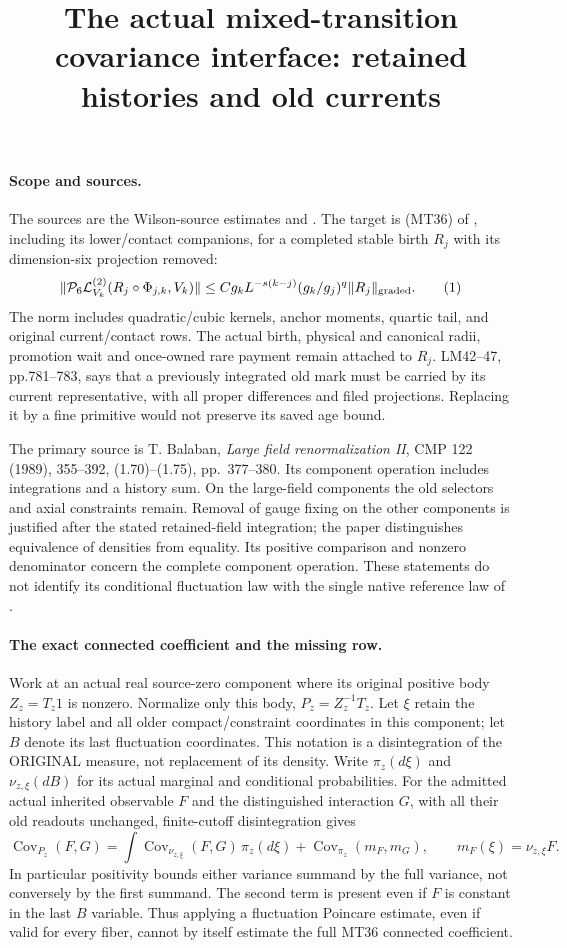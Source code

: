 \documentclass[11pt]{article}
\title{The actual mixed-transition covariance interface: retained histories and old currents}\author{}\date{}
\newcommand{\Cov}{\operatorname{Cov}}
\begin{document}
\maketitle
\paragraph{Scope and sources.}
The sources are the Wilson-source estimates \cite{W} and \cite{ND}.
The target is (MT36) of \cite[p.~692]{W}, including its lower/contact companions, for a
completed stable birth $R_j$ with its dimension-six projection removed:
\[
 \|\mathcal P_6\mathcal L^{(2)}_{V_k}(R_j\circ\Phi_{j,k},V_k)\|
 \le Cg_k L^{-s(k-j)}(g_k/g_j)^q\|R_j\|_{\rm graded}.
\tag{1}
\]
The norm includes quadratic/cubic kernels, anchor moments, quartic tail, and
original current/contact rows. The actual birth, physical and canonical radii,
promotion wait and once-owned rare payment remain attached to $R_j$.
LM42--47, pp.781--783, says that a previously integrated old mark must be carried
by its current representative, with all proper differences and filed projections.
Replacing it by a fine primitive would not preserve its saved age bound.

The primary source is T. Balaban, \emph{Large field renormalization II},
CMP 122 (1989), 355--392, (1.70)--(1.75), pp.~377--380.
Its component operation includes integrations and a history sum. On the large-field
components the old selectors and axial constraints remain. Removal of gauge fixing
on the other components is justified after the stated retained-field integration;
the paper distinguishes equivalence of densities from equality. Its positive
comparison and nonzero denominator concern the complete component operation.
These statements do not identify its conditional fluctuation law with the
single native reference law of \cite[Section 3]{ND}.

\paragraph{The exact connected coefficient and the missing row.}
Work at an actual real source-zero component where its original positive body
$Z_z=T_z1$ is nonzero. Normalize only this body, $P_z=Z_z^{-1}T_z$.
Let $\xi$ retain the history label and all older compact/constraint coordinates
in this component; let $B$ denote its last fluctuation coordinates. This notation
is a disintegration of the ORIGINAL measure, not replacement of its density.
Write $\pi_z(d\xi)$ and $\nu_{z,\xi}(dB)$ for its actual marginal and conditional
probabilities. For the admitted actual inherited observable $F$ and the distinguished
interaction $G$, with all their old readouts unchanged, finite-cutoff disintegration gives
\[
 \Cov_{P_z}(F,G)=
 \int\Cov_{\nu_{z,\xi}}(F,G)\,\pi_z(d\xi)
 +\Cov_{\pi_z}(m_F,m_G),\qquad
 m_F(\xi)=\nu_{z,\xi}F.                         \tag{2}
\]
In particular positivity bounds either variance summand by the full variance, not
conversely by the first summand. The second term is present even if $F$ is constant
in the last $B$ variable. Thus applying a fluctuation Poincare estimate, even if
valid for every fiber, cannot by itself estimate the full MT36 connected coefficient.
\end{document}
